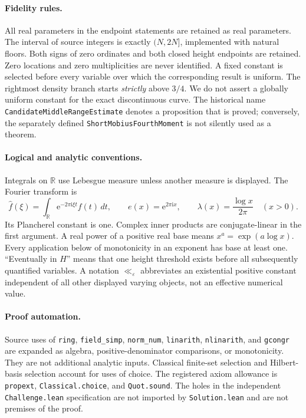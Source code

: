\documentclass[11pt,a4paper,oneside]{book}
\theoremstyle{definition}
\newcommand{\R}{\mathbb R}
\newcommand{\eps}{\varepsilon}
\newcommand{\ii}{\mathrm i}
\newcommand{\e}{\mathrm e}
\newcommand{\lean}[1]{\nolinkurl{#1}}
\newcommand{\Hhat}{\widehat}
\begin{document}
\paragraph{Fidelity rules.}
All real parameters in the endpoint statements are retained as real parameters.
The interval of source integers is exactly $(N,2N]$, implemented with natural
floors. Both signs of zero ordinates and both closed height endpoints are
retained. Zero locations and zero multiplicities are never identified. A fixed
constant is selected before every variable over which the corresponding result
is uniform. The rightmost density branch starts \emph{strictly} above $3/4$.
We do not assert a globally uniform constant for the exact discontinuous curve.
The historical name \lean{CandidateMiddleRangeEstimate} denotes a proposition
that is proved; conversely, the separately defined
\lean{ShortMobiusFourthMoment} is not silently used as a theorem.

\paragraph{Logical and analytic conventions.}
Integrals on $\R$ use Lebesgue measure unless another measure is displayed.
The Fourier transform is
\[
 \Hhat f(\xi)=\int_{\R}\e^{-2\pi\ii\xi t}f(t)\,dt,
 \qquad e(x)=\e^{2\pi\ii x},\qquad
 \lambda(x)=\frac{\log x}{2\pi}\quad(x>0).
\]
Its Plancherel constant is one. Complex inner products are conjugate-linear in
the first argument. A real power of a positive real base means
$x^a=\exp(a\log x)$. Every application below of monotonicity in an exponent has
base at least one. ``Eventually in $H$'' means that one height threshold exists
before all subsequently quantified variables. A notation $\ll_{\eps}$ abbreviates
an existential positive constant independent of all other displayed varying
objects, not an effective numerical value.

\paragraph{Proof automation.}
Source uses of \lean{ring}, \lean{field_simp}, \lean{norm_num},
\lean{linarith}, \lean{nlinarith}, and \lean{gcongr} are expanded as algebra,
positive-denominator comparisons, or monotonicity. They are not additional
analytic inputs. Classical finite-set selection and Hilbert-basis selection
account for uses of choice. The registered axiom allowance is
\lean{propext}, \lean{Classical.choice}, and \lean{Quot.sound}.
The holes in the independent \lean{Challenge.lean} specification are not imported
by \lean{Solution.lean} and are not premises of the proof.
\tableofcontents
\mainmatter
\end{document}
